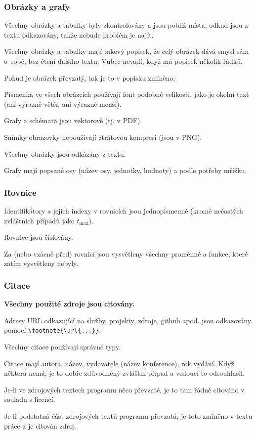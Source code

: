 \subsubsection*{Obrázky a grafy}
\begin{checklist}
	\item Všechny obrázky a tabulky byly zkontrolovány a jsou poblíž místa, odkud jsou z textu odkazovány, takže nebude problém je najít.
	\item Všechny obrázky a tabulky mají takový popisek, že celý obrázek dává smysl sám o~sobě, bez čtení dalšího textu. Vůbec nevadí, když má popisek několik řádků.
	\item Pokud je obrázek převzatý, tak je to v popisku zmíněno: 
	\item Písmenka ve všech obrázcích používají font podobné velikosti, jako je okolní text (ani výrazně větší, ani výrazně menší).
	\item Grafy a schémata jsou vektorově (tj. v PDF).
	\item Snímky obrazovky nepoužívají ztrátovou kompresi (jsou v PNG).
	\item Všechny obrázky jsou odkázány z textu.
	\item Grafy mají popsané osy (název osy, jednotky, hodnoty) a podle potřeby mřížku.
\end{checklist}

\subsubsection*{Rovnice}
\begin{checklist}
	\item Identifikátory a jejich indexy v rovnicích jsou jednopísmenné (kromě nečastých zvláštních případů jako $t_\mathrm{max}$).
	\item Rovnice jsou číslovány.
	\item Za (nebo vzácně před) rovnicí jsou vysvětleny všechny proměnné a funkce, které zatím vysvětleny nebyly.
\end{checklist}

\subsubsection*{Citace}
\begin{checklist}
    \item \textbf{Všechny použité zdroje jsou citovány.}
	\item Adresy URL odkazující na služby, projekty, zdroje, github apod. jsou odkazovány pomocí \verb|\footnote{\url{...}}|.
    \item Všechny citace používají správné typy.
	\item Citace mají autora, název, vydavatele (název konference), rok vydání.  Když některá nemá, je to dobře zdůvodněný zvláštní případ a vedoucí to odsouhlasil.
	\item Je-li ve zdrojových textech programu něco převzaté, je to tam řádně citováno v souladu s licencí.
	\item Je-li podstatná část zdrojových textů programu převzatá, je toto zmíněno v textu práce a je citován zdroj.
\end{checklist}

